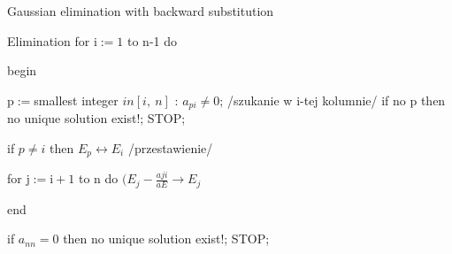 \begin{frame}{Gaussian elimination with backward substitution}

\begin{exampleblock}{Elimination}
for $\mathrm{i}:=1$ to n-1 do

\hspace{4mm} begin

\hspace{7mm} $\mathrm{p}:=$smallest integer $in[i,\ n]$ : $a_{pi}\neq 0$; /szukanie w i-tej 
\hspace*{7mm} kolumnie/ \newline
\hspace*{7mm} if no $\mathrm{p}$ then no unique solution exist!; STOP;

\hspace{7mm} if $p\neq i$ then $E_{p}\leftrightarrow E_{i}$ /przestawienie/

\hspace{7mm} for $\mathrm{j}:=\mathrm{i}+1$ to $\mathrm{n}$ do $(E_{j}-\displaystyle \frac{aji}{aE}\rightarrow E_{j}$

\hspace{4mm} end

if $a_{nn}=0$ then no unique solution exist!; STOP;
    	\end{exampleblock}

\end{frame}

